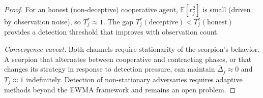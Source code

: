 \begin{proof}
For an honest (non-deceptive) cooperative agent, $\mathbb{E}[r_j^2]$ is
small (driven by observation noise), so $T_j^* \approx 1$. The gap
$T_j^*(\text{deceptive}) < T_j^*(\text{honest})$ provides a detection
threshold that improves with observation count.

\emph{Convergence caveat.} Both channels require stationarity of the
scorpion's behavior. A scorpion that alternates between cooperative and
contracting phases, or that changes its strategy in response to detection
pressure, can maintain $\bar{\Delta}_j \approx 0$ and $T_j \approx 1$
indefinitely. Detection of non-stationary adversaries requires adaptive
methods beyond the EWMA framework and remains an open problem.
\end{proof}

